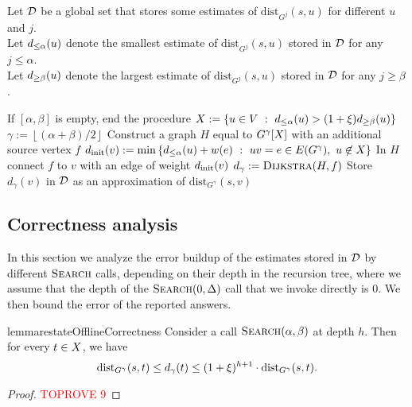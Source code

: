 \documentclass[11pt,letterpaper]{article}
\theoremstyle{plain}
\newcommand{\dist}{\mathrm{dist}}
\newcommand{\set}[1]{\left\lbrace #1 \right\rbrace}
\begin{document}
\begin{algorithm}[t]
\caption{($\alpha$, $\beta$)}\label{alg:offline}
Let $\mathcal{D}$ be a global set that stores some estimates of $\dist_{G^j}(s,u)$ for different $u$ and $j$. \\
Let $d_{\le\alpha}(u)$ denote the smallest estimate of $\dist_{G^j}(s,u)$ stored in $\mathcal{D}$ for any $j \le \alpha$. \\
Let $d_{\ge\beta}(u)$ denote the largest estimate of $\dist_{G^j}(s,u)$ stored in $\mathcal{D}$ for any $j \ge \beta$.
\begin{algorithmic}[1]
  \State If $[\alpha, \beta]$ is empty, end the procedure
  \State $\VV := \set{u\in V \ : \  \dla(u) > (1 + \epsp)\dgb(u)}$\label{line:VV}
  \State $\gamma := \left\lfloor\left(\alpha + \beta\right) / 2\right\rfloor$
  \State Construct a graph $H$ equal to $G^\gamma[X]$ with an additional source vertex $f$
        \State $\dinit(v) := \min\set{\dla(u) + w(e) \ : \ uv=e \in E(G^\gamma), \ u \not \in \VV}$ \label{line:d_init}
    \State In $H$ connect $f$ to $v$ with an edge of weight $d_\mathrm{init}(v)$
  \EndFor
  \State $\dg := \Call{Dijkstra}{H, f}$ \Comment{$\dg(v) = \dist_H(f, v)$ for all $v$} \label{line:Dijkstra}
    \State Store $d_\gamma(v)$ in $\mathcal{D}$ as an approximation of $\dist_{G^\gamma}(s,v)$
  \EndFor
  \State {}
  \State {}
\end{algorithmic}
\end{algorithm}

\subsection{Correctness analysis}
In this section we analyze the error buildup of the estimates stored in $\mathcal{D}$ by different $\textproc{Search}$ calls, depending on their depth in the recursion tree, where we assume that the depth of the $\textproc{Search}(0, \Delta)$ call that we invoke directly is $0$. 
We then bound the error of the reported answers.

\begin{restatable}[]{lemma}{restateOfflineCorrectness}\label{theorem:error bound}
Consider a call $\textproc{Search}(\alpha, \beta)$ at depth $h$. Then for every $t\in X$, we have
\[ \dist_{G^\gamma}(s,t)\leq d_\gamma(t) \leq (1+\epsp)^{h+1}\cdot \dist_{G^\gamma}(s,t). \]
\end{restatable}
\begin{proof}\textcolor{red}{TOPROVE 9}\end{proof}
\end{document}
